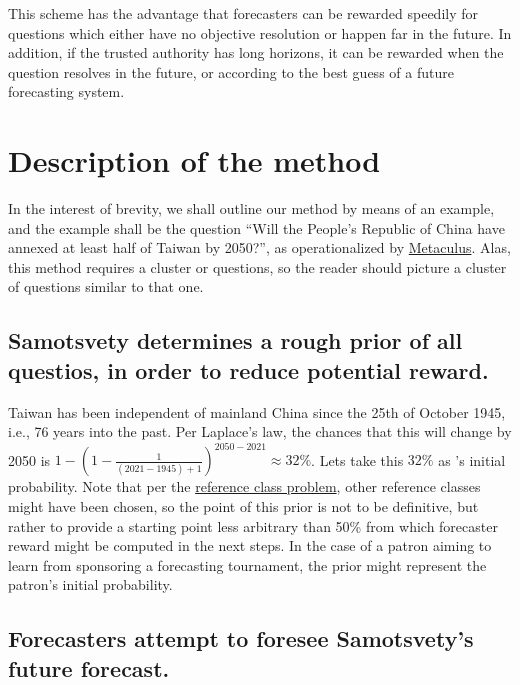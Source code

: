 \documentclass[]{article}
\begin{document}
This scheme has the advantage that forecasters can be rewarded speedily
for questions which either have no objective resolution or happen far in
the future. In addition, if the trusted authority has long horizons, it
can be rewarded when the question resolves in the future, or according
to the best guess of a future forecasting system.

\hypertarget{description-of-the-method}{%
\section{Description of the method}\label{description-of-the-method}}

In the interest of brevity, we shall outline our method by means of an
example, and the example shall be the question ``Will the People's
Republic of China have annexed at least half of Taiwan by 2050?'', as
operationalized by
\href{https://www.metaculus.com/questions/5320/chinese-annexation-of-most-of-taiwan-by-2050/}{Metaculus}.
Alas, this method requires a cluster or questions, so the reader should
picture a cluster of questions similar to that one.

\hypertarget{samotsvety-determines-a-rough-prior-of-all-questios-in-order-to-reduce-potential-reward.}{%
\subsection{Samotsvety determines a rough prior of all questios, in
order to reduce potential
reward.}\label{samotsvety-determines-a-rough-prior-of-all-questios-in-order-to-reduce-potential-reward.}}

Taiwan has been independent of mainland China since the 25th of October
1945, i.e., 76 years into the past. Per Laplace's law, the chances that
this will change by 2050 is
\(1-(1-\frac{1}{(2021-1945)+1})^{2050-2021} \approx 32\%\). Lets take
this \(32\%\) as 's initial probability. Note that per the
\href{https://en.wikipedia.org/wiki/Reference_class_problem}{reference
class problem}, other reference classes might have been chosen, so the
point of this prior is not to be definitive, but rather to provide a
starting point less arbitrary than 50\% from which forecaster reward
might be computed in the next steps. In the case of a patron aiming to
learn from sponsoring a forecasting tournament, the prior might
represent the patron's initial probability.

\hypertarget{forecasters-attempt-to-foresee-samotsvetys-future-forecast.}{%
\subsection{Forecasters attempt to foresee Samotsvety's future
forecast.}\label{forecasters-attempt-to-foresee-samotsvetys-future-forecast.}}
\end{document}
